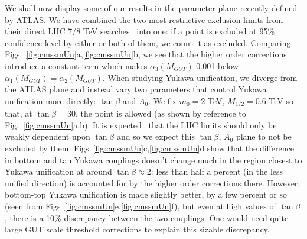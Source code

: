 \documentclass[final,3p,times,pdflatex]{elsarticle}
\begin{document}
We shall now display some of our results in the parameter plane recently
defined by ATLAS.  
We have combined the two most restrictive exclusion limits from their direct
LHC 7/8 
TeV searches~\cite{Aad:2014wea} into one: if a
point is excluded at 95$\%$ confidence level by either or both of them, we
count it as excluded.  Comparing Figs.~\ref{fig:cmssmUn}a,\ref{fig:cmssmUn}b,
we see that the higher order corrections introduce a constant term which 
makes $\alpha_3(M_{GUT})$ 0.001 below $\alpha_1(M_{GUT})=\alpha_2(M_{GUT})$.
When studying Yukawa unification, we diverge from the ATLAS plane and instead
vary two parameters that control Yukawa unification more directly: $\tan
\beta$ and $A_0$. We fix $m_0=2$ TeV, $M_{1/2}=0.6$ TeV so that, at $\tan
\beta=30$, the point is allowed (as shown by reference to
Fig.~\ref{fig:cmssmUn}a,b). It is expected~\cite{Allanach:2011ut} that the LHC
limits should 
only be weakly 
dependent upon $\tan \beta$ and so we expect this $\tan \beta$, $A_0$
plane to not be excluded by
them. 
Figs~\ref{fig:cmssmUn}c,\ref{fig:cmssmUn}d show that
the difference in bottom and tau Yukawa couplings doesn't change much
in the region closest to Yukawa unification at around $\tan \beta \approx 2$:
less than half a percent (in the less unified direction) is accounted for by
the higher order corrections there.
However, bottom-top Yukawa unification is made slightly better, by a few 
percent or so (seen from Figs~\ref{fig:cmssmUn}e,\ref{fig:cmssmUn}f), but 
even at high values of 
$\tan \beta$, there is a 10$\%$ discrepancy between the two couplings. One
would need quite large GUT scale threshold corrections to explain this
sizable discrepancy.
\end{document}
